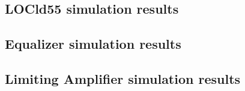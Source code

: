 \documentclass[11pt,a4paper]{article}
\begin{document}
\begin{spacing}{1.25}
\section{LOCld55 simulation results}        %

\subsection{Equalizer simulation results}

\subsection{Limiting Amplifier simulation results}


\end{spacing}



\end{document}

